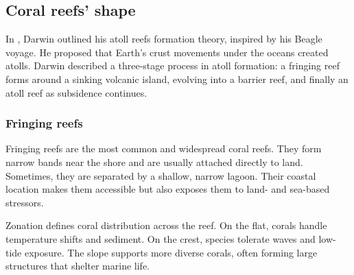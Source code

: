 \subsection{Coral reefs' shape}
In \citep{Darwin1842}, Darwin outlined his atoll reefs formation theory, inspired by his Beagle voyage. He proposed that Earth's crust movements under the oceans created atolls. Darwin described a three-stage process in atoll formation: a fringing reef forms around a sinking volcanic island, evolving into a barrier reef, and finally an atoll reef as subsidence continues.

\subsubsection{Fringing reefs}
Fringing reefs are the most common and widespread coral reefs. They form narrow bands near the shore and are usually attached directly to land. Sometimes, they are separated by a shallow, narrow lagoon. Their coastal location makes them accessible but also exposes them to land- and sea-based stressors.

    
    Zonation defines coral distribution across the reef. On the flat, corals handle temperature shifts and sediment. On the crest, species tolerate waves and low-tide exposure. The slope supports more diverse corals, often forming large structures that shelter marine life.

